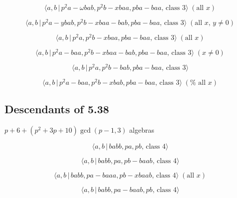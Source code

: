 \documentclass[10pt]{article}
\begin{document}
\begin{equation}
\langle a,b\,|\,p^{2}a-\omega bab,p^{2}b-xbaa,pba-baa,\,\text{class }%
3\rangle \;(\text{all }x)  \tag{7.37}
\end{equation}

\begin{equation}
\langle a,b\,|\,p^{2}a-ybab,p^{2}b-xbaa-bab,pba-baa,\,\text{class }3\rangle
\;(\text{all }x,\,y\neq 0)  \tag{7.38}
\end{equation}

\begin{equation}
\langle a,b\,|\,p^2a,p^2b-xbaa,pba-baa,\,\text{class }3\rangle \;(\text{all }%
x)  \tag{7.39}
\end{equation}

\begin{equation}
\langle a,b\,|\,p^2a-baa,p^2b-xbaa-bab,pba-baa,\,\text{class }3\rangle \;(x
\neq 0)  \tag{7.40}
\end{equation}

\begin{equation}
\langle a,b\,|\,p^2a,p^2b-bab,pba-baa,\,\text{class }3\rangle  \tag{7.41}
\end{equation}

\begin{equation}
\langle a,b\,|\,p^2a-baa,p^2b-xbab,pba-baa,\,\text{class }3\rangle \;(\text{%
all }x)  \tag{7.42}
\end{equation}

\subsection{Descendants of 5.38}

$p+6+(p^{2}+3p+10)\gcd (p-1,3)$ algebras

\begin{equation}
\langle a,b\,|\,babb,pa,pb,\,\text{class }4\rangle  \tag{7.43}
\end{equation}

\begin{equation}
\langle a,b\,|\,babb,pa,pb-baab,\,\text{class }4\rangle  \tag{7.44}
\end{equation}

\begin{equation}
\langle a,b\,|\,babb,pa-baaa,pb-xbaab,\,\text{class }4\rangle \;(\text{all }%
x)  \tag{7.45}
\end{equation}

\begin{equation}
\langle a,b\,|\,babb,pa-baab,pb,\,\text{class }4\rangle  \tag{7.46}
\end{equation}
\end{document}
